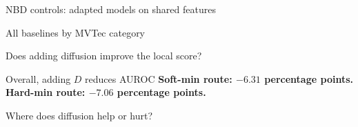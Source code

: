 \documentclass[aspectratio=169,professionalfonts,10pt]{beamer}
\def\phase{NBD}
\begin{document}
\def\phase{RESULTS}
\begin{frame}[t]{NBD controls: adapted models on shared features}
\small
\vspace{.35cm}
\begin{center}
\large
\renewcommand{\arraystretch}{1.28}\setlength{\tabcolsep}{9pt}

\end{center}
\end{frame}

\def\phase{RESULTS}
\begin{frame}[t]{All baselines by MVTec category}
\footnotesize
\begin{center}
\renewcommand{\arraystretch}{0.92}\setlength{\tabcolsep}{4.3pt}

\end{center}
\end{frame}

\def\phase{RESULTS}
\begin{frame}[t]{Does adding diffusion improve the local score?}
\small
\vspace{.60cm}
\begin{center}
\renewcommand{\arraystretch}{1.85}\setlength{\tabcolsep}{8pt}

\end{center}
\vspace{.42cm}
\begin{block}{Overall, adding $D$ reduces AUROC}
\textbf{Soft-min route: $-6.31$ percentage points.}\\[.14cm]
\textbf{Hard-min route: $-7.06$ percentage points.}
\end{block}
\end{frame}

\def\phase{RESULTS}
\begin{frame}[t]{Where does diffusion help or hurt?}
\footnotesize
\begin{center}
\renewcommand{\arraystretch}{1.03}\setlength{\tabcolsep}{15pt}

\end{center}
\end{frame}
\end{document}
